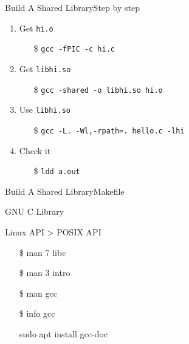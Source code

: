 \begin{frame}{Build A Shared Library}{Step by step}
  \begin{enumerate}
  \item Get \alert{\texttt{hi.o}}
    \begin{itemize}
    \item[\$] \texttt{gcc -fPIC -c hi.c}
    \end{itemize}
  \item Get \alert{\texttt{libhi.so}}
    \begin{itemize}
    \item[\$] \texttt{gcc -shared -o libhi.so hi.o}
    \end{itemize}
  \item Use \alert{\texttt{libhi.so}}
    \begin{itemize}
    \item[\$] \texttt{gcc -L. -Wl,-rpath=. hello.c -lhi}
    \end{itemize}
  \item Check it
    \begin{itemize}
    \item[\$] \texttt{ldd a.out}
    \end{itemize}
  \end{enumerate}
\end{frame}

\begin{frame}{Build A Shared Library}{Makefile}
  \begin{center}
  \end{center}
\end{frame}

\begin{frame}{GNU C Library}
  \begin{minipage}{.55\linewidth}
    Linux API > POSIX API
    \ttfamily
    \begin{itemize}
    \item[\$] man 7 libc
    \item[\$] man 3 intro
    \item[\$] man gcc
    \item[\$] info gcc
    \item[\debian] sudo apt install gcc-doc
    \end{itemize}
  \end{minipage}
  \begin{minipage}{.4\linewidth}
    \begin{center}
    \end{center}
  \end{minipage}
\end{frame}

